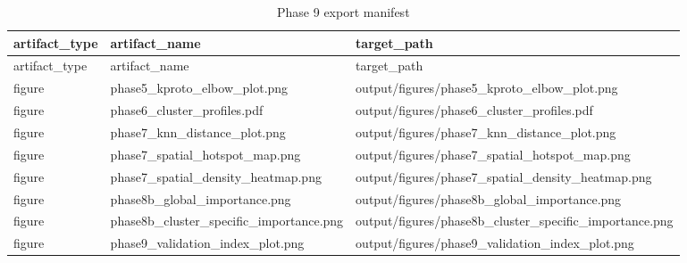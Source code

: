 \documentclass[
]{article}
\begin{document}
\begin{longtable}[]{@{}
  >{\raggedright\arraybackslash}p{}
  >{\raggedright\arraybackslash}p{}
  >{\raggedright\arraybackslash}p{}@{}}
\caption{Phase 9 export manifest}\tabularnewline
\toprule\noalign{}
\begin{minipage}[b]{\linewidth}\raggedright
artifact\_type
\end{minipage} & \begin{minipage}[b]{\linewidth}\raggedright
artifact\_name
\end{minipage} & \begin{minipage}[b]{\linewidth}\raggedright
target\_path
\end{minipage} \\
\midrule\noalign{}
\endfirsthead
\toprule\noalign{}
\begin{minipage}[b]{\linewidth}\raggedright
artifact\_type
\end{minipage} & \begin{minipage}[b]{\linewidth}\raggedright
artifact\_name
\end{minipage} & \begin{minipage}[b]{\linewidth}\raggedright
target\_path
\end{minipage} \\
\midrule\noalign{}
\endhead
\bottomrule\noalign{}
\endlastfoot
figure & phase5\_kproto\_elbow\_plot.png &
output/figures/phase5\_kproto\_elbow\_plot.png \\
figure & phase6\_cluster\_profiles.pdf &
output/figures/phase6\_cluster\_profiles.pdf \\
figure & phase7\_knn\_distance\_plot.png &
output/figures/phase7\_knn\_distance\_plot.png \\
figure & phase7\_spatial\_hotspot\_map.png &
output/figures/phase7\_spatial\_hotspot\_map.png \\
figure & phase7\_spatial\_density\_heatmap.png &
output/figures/phase7\_spatial\_density\_heatmap.png \\
figure & phase8b\_global\_importance.png &
output/figures/phase8b\_global\_importance.png \\
figure & phase8b\_cluster\_specific\_importance.png &
output/figures/phase8b\_cluster\_specific\_importance.png \\
figure & phase9\_validation\_index\_plot.png &
output/figures/phase9\_validation\_index\_plot.png \\

\end{longtable}
\end{document}
